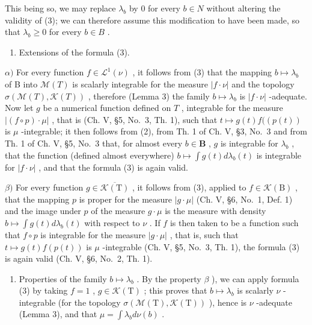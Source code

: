 This being so, we may replace \(\lambda_{b}\) by 0 for every \(b \in N\) without altering the validity of (3); we can therefore assume this modification to have been made, so that \(\lambda_{b} \geqslant 0\) for every \(b \in B\) .

\begin{enumerate}
\def\labelenumi{\arabic{enumi})}
\setcounter{enumi}{2}
\tightlist
\item
  Extensions of the formula (3).
\end{enumerate}

\(\alpha)\) For every function \(f \in \mathcal{L}^1(\nu)\) , it follows from (3) that the mapping \(b \mapsto \lambda_b\) of B into \(\mathcal{M}(T)\) is scalarly integrable for the measure \(|f \cdot \nu|\) and the topology \(\sigma(\mathcal{M}(T), \mathcal{K}(T))\) , therefore (Lemma 3) the family \(b \mapsto \lambda_b\) is \(|f \cdot \nu|\) -adequate. Now let \(g\) be a numerical function defined on \(T\) , integrable for the measure \(|(f \circ p) \cdot \mu|\) , that is (Ch. V, §5, No.~3, Th. 1), such that \(t \mapsto g(t)f((p(t))\) is \(\mu\) -integrable; it then follows from (2), from Th. 1 of Ch. V, §3, No.~3 and from Th. 1 of Ch. V, §5, No.~3 that, for almost every \(b \in \mathbf{B}\) , \(g\) is integrable for \(\lambda_b\) , that the function (defined almost everywhere) \(b \mapsto \int g(t)d\lambda_b(t)\) is integrable for \(|f \cdot \nu|\) , and that the formula (3) is again valid.

\(\beta)\) For every function \(g \in \overline{\mathcal{K}(\mathrm{T})}\) , it follows from (3), applied to \(f \in \mathcal{K}(\mathrm{B})\) , that the mapping \(p\) is proper for the measure \(|g \cdot \mu|\) (Ch. V, §6, No.~1, Def. 1) and the image under \(p\) of the measure \(g \cdot \mu\) is the measure with density \(b \mapsto \int g(t) d\lambda_b(t)\) with respect to \(\nu\) . If \(f\) is then taken to be a function such that \(f \circ p\) is integrable for the measure \(|g \cdot \mu|\) , that is, such that \(t \mapsto g(t)f(p(t))\) is \(\mu\) -integrable (Ch. V, §5, No.~3, Th. 1), the formula (3) is again valid (Ch. V, §6, No.~2, Th. 1).

\begin{enumerate}
\def\labelenumi{\arabic{enumi})}
\setcounter{enumi}{3}
\tightlist
\item
  Properties of the family \(b \mapsto \lambda_b\) . By the property \(\beta\) ), we can apply formula (3) by taking \(f = 1\) , \(g \in \mathcal{K}(\mathrm{T})\) ; this proves that \(b \mapsto \lambda_b\) is scalarly \(\nu\) -integrable (for the topology \(\sigma(\mathcal{M}(\mathrm{T}), \mathcal{K}(\mathrm{T}))\) ), hence is \(\nu\) -adequate (Lemma 3), and that \(\mu = \int \lambda_b d\nu(b)\) .
\end{enumerate}

